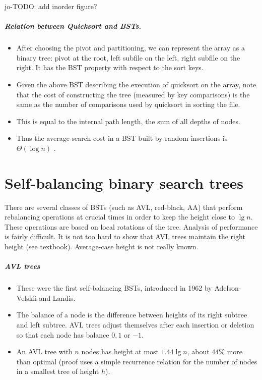 jo-TODO: add inorder figure?


\paragraph{Relation between Quicksort and BSTs.}
\begin{itemize}
\item After choosing the pivot and partitioning, we can represent the array as a 
binary tree: pivot at the root, left subfile on the left, right subfile on the 
right. It has the BST property with respect to the sort keys.
\item Given the above BST describing the execution of quicksort on the array, 
note that the cost of constructing the tree (measured by key comparisons) is 
the same as the number of comparisons used by quicksort in sorting the file.
\item This is equal to the {internal path length}, the sum of all depths 
of nodes. 
\item Thus the average search cost in a BST built by random insertions is $\Theta(\log n)$ .
\end{itemize}






\chapter{Self-balancing binary search trees} %
\label{sec:balanced}

There are several classes of BSTs (such as AVL, red-black, AA) that 
perform rebalancing operations at crucial times in order to keep the height 
close to $\lg n$.
These operations are based on local {rotations} of the tree.
Analysis of performance is fairly difficult.
It is not too hard to show that AVL trees maintain the right height (see textbook). 
Average-case height is not really known.

\paragraph{AVL trees}
\begin{itemize}
\item These were the first self-balancing BSTs, introduced in 1962 by 
Adelson-Velskii and Landis.
\item The {balance of a node} is the difference between heights of its 
right subtree and left subtree. AVL trees adjust themselves after each insertion 
or deletion so that each node has balance $0, 1$ or $-1$.
\item An AVL tree with $n$ nodes has height at most $1.44 \lg n$, about $44\%$ more 
than optimal (proof uses a simple recurrence relation for the number of nodes in 
a smallest tree of height $h$).
\end{itemize}

